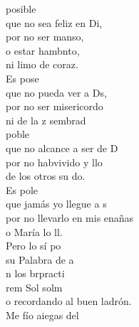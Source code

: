 \begin{cancion}%
	posible\\
	que no sea feliz en Di,\\
	\jump
por no ser manso, \\
	o estar hambnto,\\
	ni limo de coraz. \\
	\jump
	Es pose\\
	que no pueda ver a Ds,\\
	por no ser misericordo\\
	ni de la z sembrad \\
	\jump
	 poble\\
	que no alcance a ser de D \\
	por no habvivido y llo \\
	de los otros su do.\\
	\jump
	Es pole\\
	que jamás yo llegue a s\\
	por no llevarlo en mis enañas\\
	o María lo ll.\\
	Pero lo sí po\\
	su Palabra de a\\
	n los brpracti  \\
	   rem             Sol solm\\
o recordando al buen ladrón.\\
	Me fío aiegas del\\
	\jump
\end{cancion}%
